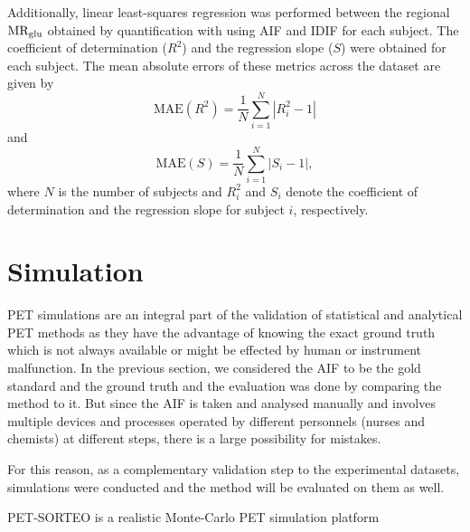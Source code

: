 Additionally, linear least-squares regression was performed between the regional \(\text{MR}_{\text{glu}}\) obtained by quantification with using AIF and IDIF for each subject. The coefficient of determination (\(R^2\)) and the regression slope (\(S\)) were obtained for each subject. The mean absolute errors of these metrics across the dataset are given by
\begin{equation}
	\text{MAE}(R^2) = \frac{1}{N} \sum_{i=1}^{N} \left| R^2_i - 1 \right|
\end{equation}
and
\begin{equation}
	\text{MAE}(S) = \frac{1}{N} \sum_{i=1}^{N} \left| S_i - 1 \right|,
\end{equation}
where $N$ is the number of subjects and \(R^2_i\) and \(S_i\) denote the coefficient of determination and the regression slope for subject \(i\), respectively.

\section{Simulation}
PET simulations are an integral part of the validation of statistical and analytical PET methods as they have the advantage of knowing the exact ground truth which is not always available or might be effected by human or instrument malfunction.
In the previous section, we considered the AIF to be the gold standard and the ground truth and the evaluation was done by comparing the method to it.
But since the AIF is taken and analysed manually and involves multiple devices and processes operated by different personnels (nurses and chemists) at different steps, there is a large possibility for mistakes.

For this reason, as a complementary validation step to the experimental datasets, simulations were conducted and the method will be evaluated on them as well.

PET-SORTEO is a realistic Monte-Carlo PET simulation platform
